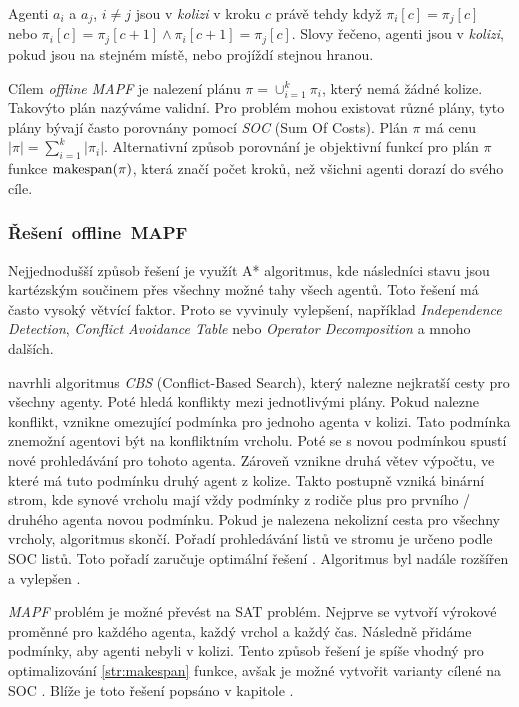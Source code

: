 Agenti $a_i$ a $a_j$, $i \neq j$ jsou v \emph{kolizi} v kroku $c$ právě tehdy když $\pi_i[c] = \pi_j[c]$ nebo
$\pi_i[c] = \pi_j[c + 1] \land \pi_i[c + 1] = \pi_j[c]$.
Slovy řečeno, agenti jsou v \emph{kolizi}, pokud jsou na stejném místě, nebo projíždí stejnou hranou.

Cílem \emph{offline MAPF} je nalezení plánu $\pi = \cup_{i=1}^{k} \pi_i$, který nemá žádné kolize.
Takovýto plán nazýváme validní.
Pro problém mohou existovat různé plány, tyto plány bývají často porovnány pomocí \emph{SOC} (Sum Of Costs).
Plán $\pi$ má cenu $|\pi| = \sum_{i=1}^{k} |\pi_i|$.
Alternativní způsob porovnání je objektivní funkcí pro plán $\pi$ funkce $\textrm{makespan}\labeltext{makespan}{str:makespan}(\pi)$,
která značí počet kroků, než všichni agenti dorazí do svého cíle.

\subsubsection{Řešení~offline~MAPF}\label{subsubsec:reseni_offline_mapf}

Nejjednodušší způsob řešení je využít A* algoritmus, kde následníci stavu jsou kartézským součinem přes všechny možné tahy všech agentů.
Toto řešení má často vysoký větvící faktor.
Proto se vyvinuly vylepšení, například \emph{Independence Detection}, \emph{Conflict Avoidance Table} nebo
\emph{Operator Decomposition} \citep{Standley_2010} a mnoho dalších.

\citet*{Sharon} navrhli algoritmus \emph{CBS} (Conflict-Based Search), který nalezne nejkratší cesty pro všechny agenty.
Poté hledá konflikty mezi jednotlivými plány.
Pokud nalezne konflikt, vznikne omezující podmínka pro jednoho agenta v kolizi.
Tato podmínka znemožní agentovi být na konfliktním vrcholu.
Poté se s novou podmínkou spustí nové prohledávání pro tohoto agenta.
Zároveň vznikne druhá větev výpočtu, ve které má tuto podmínku druhý agent z kolize.
Takto postupně vzniká binární strom, kde synové vrcholu mají vždy podmínky z rodiče plus pro prvního / druhého agenta novou podmínku.
Pokud je nalezena nekolizní cesta pro všechny vrcholy, algoritmus skončí.
Pořadí prohledávání listů ve stromu je určeno podle SOC listů.
Toto pořadí zaručuje optimální řešení \citep{Sharon}.
Algoritmus byl nadále rozšířen a vylepšen \citep{Boyarski}.

\emph{MAPF} problém je možné převést na SAT problém.
Nejprve se vytvoří výrokové proměnné pro každého agenta, každý vrchol a každý čas.
Následně přidáme podmínky, aby agenti nebyli v kolizi.
Tento způsob řešení je spíše vhodný pro optimalizování \ref{str:makespan} funkce,
avšak je možné vytvořit varianty cílené na SOC \citep{bartak}.
Blíže je toto řešení popsáno v kapitole .


